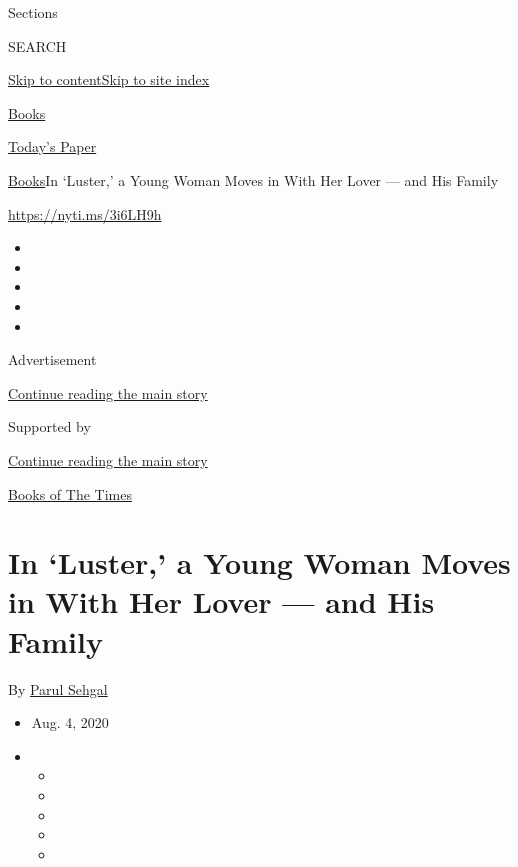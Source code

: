 Sections

SEARCH

\protect\hyperlink{site-content}{Skip to
content}\protect\hyperlink{site-index}{Skip to site index}

\href{https://www.nytimes.com/section/books}{Books}

\href{https://myaccount.nytimes.com/auth/login?response_type=cookie\&client_id=vi}{}

\href{https://www.nytimes.com/section/todayspaper}{Today's Paper}

\href{/section/books}{Books}\textbar{}In `Luster,' a Young Woman Moves
in With Her Lover --- and His Family

\url{https://nyti.ms/3i6LH9h}

\begin{itemize}
\item
\item
\item
\item
\item
\end{itemize}

Advertisement

\protect\hyperlink{after-top}{Continue reading the main story}

Supported by

\protect\hyperlink{after-sponsor}{Continue reading the main story}

\href{/column/books-of-the-times}{Books of The Times}

\hypertarget{in-luster-a-young-woman-moves-in-with-her-lover--and-his-family}{%
\section{In `Luster,' a Young Woman Moves in With Her Lover --- and His
Family}\label{in-luster-a-young-woman-moves-in-with-her-lover--and-his-family}}

By \href{https://www.nytimes.com/by/parul-sehgal}{Parul Sehgal}

\begin{itemize}
\item
  Aug. 4, 2020
\item
  \begin{itemize}
  \item
  \item
  \item
  \item
  \item
  \end{itemize}
\end{itemize}

